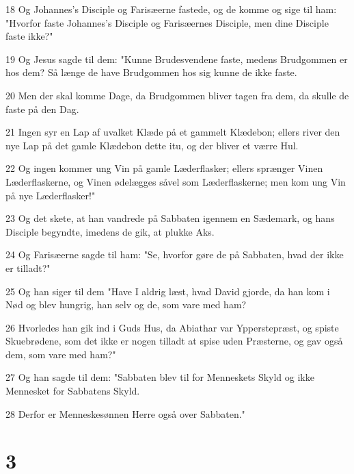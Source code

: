 \par 18 Og Johannes's Disciple og Farisæerne fastede, og de komme og sige til ham: "Hvorfor faste Johannes's Disciple og Farisæernes Disciple, men dine Disciple faste ikke?"
\par 19 Og Jesus sagde til dem: "Kunne Brudesvendene faste, medens Brudgommen er hos dem? Så længe de have Brudgommen hos sig kunne de ikke faste.
\par 20 Men der skal komme Dage, da Brudgommen bliver tagen fra dem, da skulle de faste på den Dag.
\par 21 Ingen syr en Lap af uvalket Klæde på et gammelt Klædebon; ellers river den nye Lap på det gamle Klædebon dette itu, og der bliver et værre Hul.
\par 22 Og ingen kommer ung Vin på gamle Læderflasker; ellers sprænger Vinen Læderflaskerne, og Vinen ødelægges såvel som Læderflaskerne; men kom ung Vin på nye Læderflasker!"
\par 23 Og det skete, at han vandrede på Sabbaten igennem en Sædemark, og hans Disciple begyndte, imedens de gik, at plukke Aks.
\par 24 Og Farisæerne sagde til ham: "Se, hvorfor gøre de på Sabbaten, hvad der ikke er tilladt?"
\par 25 Og han siger til dem "Have I aldrig læst, hvad David gjorde, da han kom i Nød og blev hungrig, han selv og de, som vare med ham?
\par 26 Hvorledes han gik ind i Guds Hus, da Abiathar var Ypperstepræst, og spiste Skuebrødene, som det ikke er nogen tilladt at spise uden Præsterne, og gav også dem, som vare med ham?"
\par 27 Og han sagde til dem: "Sabbaten blev til for Menneskets Skyld og ikke Mennesket for Sabbatens Skyld.
\par 28 Derfor er Menneskesønnen Herre også over Sabbaten."

\chapter{3}

